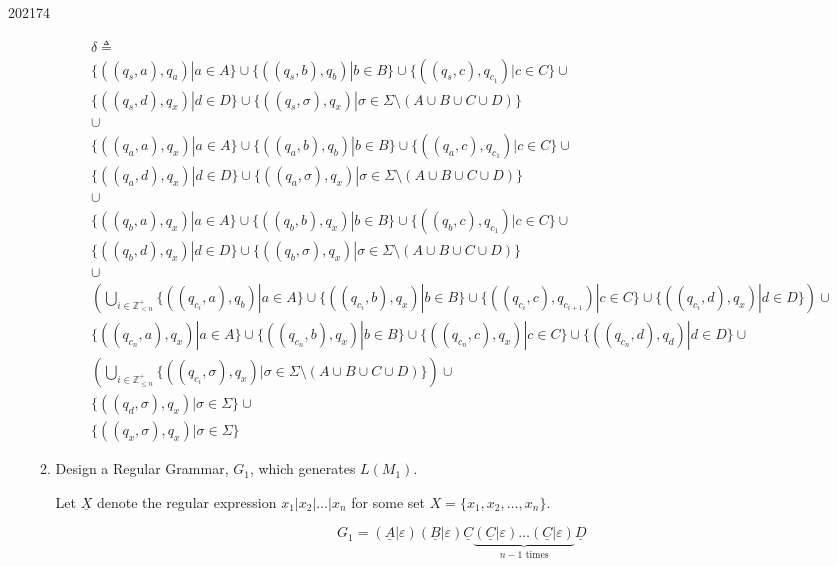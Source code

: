 \documentclass[10pt,\jkfside,a4paper]{article}
\begin{document}
\begin{examquestion}{2021}{7}{4}
\begin{enumerate}[label=(\alph*)]
\begin{enumerate}[label=(\roman*)]
\begin{gather*}
\delta \triangleq \\
\{((q_s, a), q_a) | a \in A\} \cup
\{((q_s, b), q_b) | b \in B\} \cup
\{((q_s, c), q_{c_1}) | c \in C\} \cup
\\
\{((q_s, d), q_x) | d \in D\} \cup
\{((q_s, \sigma), q_x)| \sigma \in \Sigma \setminus (A \cup B \cup C \cup D)
\}
\\
\cup
\\
\{((q_a, a), q_x) | a \in A\} \cup
\{((q_a, b), q_b) | b \in B\} \cup
\{((q_a, c), q_{c_1}) | c \in C\} \cup
\\
\{((q_a, d), q_x) | d \in D\} \cup
\{((q_a, \sigma), q_x)| \sigma \in \Sigma \setminus (A \cup B \cup C \cup D)
\}
\\
\cup
\\
\{((q_b, a), q_x) | a \in A\} \cup
\{((q_b, b), q_x) |  b \in B\} \cup
\{((q_b, c), q_{c_1}) |  c \in C\} \cup
\\
\{((q_b, d), q_x) | d \in D\} \cup
\{((q_b, \sigma), q_x)| \sigma \in \Sigma \setminus (A \cup B \cup C \cup D)
\}
\\
\cup
\\
\left(
\bigcup_{i\in \mathbb{Z}^+_{< n}}
\{((q_{c_i}, a), q_b) | a \in A\} \cup
\{((q_{c_i}, b), q_x) | b \in B\} \cup
\{((q_{c_i}, c), q_{c_{i+1}}) | c \in C\} \cup
\{((q_{c_i}, d), q_x) | d \in D\}
\right) \cup
\\
\{((q_{c_n}, a), q_x) | a \in A\} \cup
\{((q_{c_n}, b), q_x) | b \in B\} \cup
\{((q_{c_n}, c), q_x) | c \in C\} \cup
\{((q_{c_n}, d), q_d) | d \in D\} \cup
\\
\left(
\bigcup_{i \in \mathbb{Z}^+_{\le n}}
\{((q_{c_i}, \sigma), q_x)| \sigma \in \Sigma \setminus (A \cup B \cup C
\cup D)
\}
\right) \cup
\\
\{((q_d, \sigma), q_x) | \sigma \in \Sigma\} \cup
\\
\{((q_x, \sigma), q_x) | \sigma \in \Sigma\}
\end{gather*}

\item Design a Regular Grammar, $G_1$, which generates $L(M_1)$.

Let $\underline X$ denote the regular expression $x_1|x_2|\dots|x_n$ for
some set $X = \{x_1, x_2, \dots, x_n\}$.

\[
G_1 = \left( \underline{A}|\varepsilon \right) \left( \underline{B}|\varepsilon
\right) \underline C \underbrace{(\underline C|\varepsilon) \dots (\underline C
|\varepsilon)}_{n-1\text{ times}}\underline D
\]


\end{enumerate}
\end{enumerate}
\end{examquestion}
\end{document}
